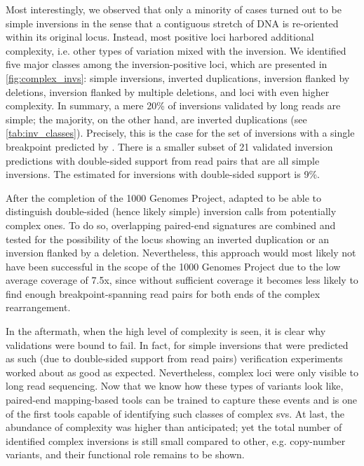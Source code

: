 Most interestingly, we observed that only a minority of cases turned out to be
simple inversions in the sense that a contiguous stretch of DNA is re-oriented
within its original locus. Instead, most positive loci harbored additional
complexity, i.e. other types of variation mixed with the inversion. We
identified five major classes among the inversion-positive loci, which are
presented in \cref{fig:complex_invs}: simple inversions, inverted duplications,
inversion flanked by deletions, inversion flanked by multiple deletions, and
loci with even higher complexity. In summary, a mere 20\% of inversions
validated by long reads are simple; the majority, on the other hand, are
inverted duplications (see \cref{tab:inv_classes}). Precisely, this is the case
for the set of inversions with a single breakpoint predicted by \delly. There is
a smaller subset of 21 validated inversion predictions with double-sided support
from read pairs that are all simple inversions. The estimated \fdr for
inversions with double-sided support is 9\%.

After the completion of the 1000 Genomes Project, \tobias adapted \delly to be
able to distinguish double-sided (hence likely simple) inversion calls from
potentially complex ones. To do so, overlapping paired-end signatures are
combined and tested for the possibility of the locus showing an inverted
duplication or an inversion flanked by a deletion. Nevertheless, this approach
would most likely not have been successful in the scope of the 1000 Genomes
Project due to the low average coverage of 7.5x, since without sufficient
coverage it becomes less likely to find enough breakpoint-spanning read pairs
for both ends of the complex rearrangement.

In the aftermath, when the high level of complexity is seen, it is clear why
\pcr validations were bound to fail. In fact, for simple inversions that were
predicted as such (due to double-sided support from read pairs) \pcr
verification experiments worked about as good as expected. Nevertheless, complex
loci were only visible to long read sequencing. Now that we know how
these types of variants look like, paired-end mapping-based tools can be trained
to capture these events and \delly is one of the first tools capable of identifying
such classes of complex \acp{sv}. At last, the abundance of complexity was higher
than anticipated; yet the total number of identified complex inversions is still
small compared to other, e.g. copy-number variants, and their functional role
remains to be shown.




